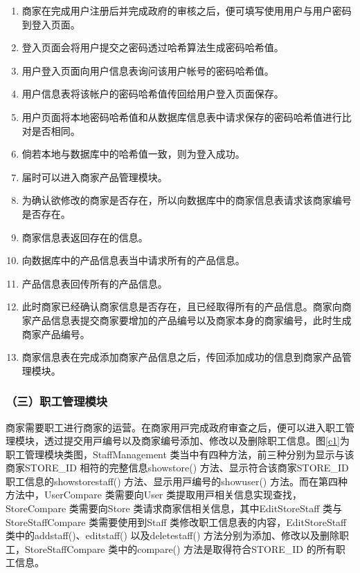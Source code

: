 	\begin{enumerate}
	\item 商家在完成用户注册后并完成政府的审核之后，便可填写使用用户与用户密码到登入页面。
	\item 登入页面会将用户提交之密码透过哈希算法生成密码哈希值。
	\item 用户登入页面向用户信息表询问该用户帐号的密码哈希值。
	\item 用户信息表将该帐户的密码哈希值传回给用户登入页面保存。
	\item 用户页面将本地密码哈希值和从数据库信息表中请求保存的密码哈希值进行比对是否相同。
	\item 倘若本地与数据库中的哈希值一致，则为登入成功。
	\item 届时可以进入商家产品管理模块。
	\item 为确认欲修改的商家是否存在，所以向数据库中的商家信息表请求该商家编号是否存在。
	\item 商家信息表返回存在的信息。
	\item 向数据库中的产品信息表当中请求所有的产品信息。
	\item 产品信息表回传所有的产品信息。
	\item 此时商家已经确认商家信息是否存在，且已经取得所有的产品信息。商家向商家产品信息表提交商家要增加的产品编号以及商家本身的商家编号，此时生成商家产品编号。
	\item 商家信息表在完成添加商家产品信息之后，传回添加成功的信息到商家产品管理模块。
	\end{enumerate}


\subsubsection{（三）职工管理模块}
商家需要职⼯进⾏商家的运营。在商家⽤⼾完成政府审查之后，便可以进⼊职⼯管理模块，透过提交⽤⼾编号以及商家编号添加、修改以及删除职⼯信息。图\ref{c1}为职⼯管理模块类图，StaffManagement 类当中有四种⽅法，前三种分别为显⽰与该商家STORE\_ID 相符的完整信息showstore() ⽅法、显⽰符合该商家STORE\_ID 职⼯信息的showstorestaff() ⽅法、显⽰⽤⼾编号的showuser() ⽅法。而在第四种方法中，UserCompare 类需要向User 类提取⽤⼾相关信息实现查找，StoreCompare 类需要向Store 类请求商家信相关信息，其中EditStoreStaff 类与StoreStaffCompare 类需要使⽤到Staff 类修改职⼯信息表的内容，EditStoreStaff 类中的addstaff()、editstaff() 以及deletestaff() ⽅法分别为添加、修改以及删除职⼯，StoreStaffCompare 类中的compare() ⽅法是取得符合STORE\_ID 的所有职⼯信息。

